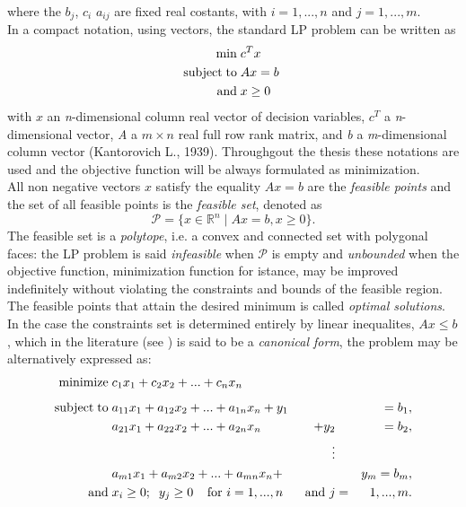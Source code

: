 \documentclass[a4paper,10 pt,titlepage,twoside]{book}
\theoremstyle{plain}
\theoremstyle{definition}
\theoremstyle{remark}
\begin{document}
where the $b_{j}$, $c_{i}$  $a_{ij}$ are fixed real costants, with $i=1,...,n$ and $j=1,...,m$.\\ In a compact notation, using vectors, the standard LP problem can be written as
\begin{equation}\label{(Prim)}
 \begin{split}
\min\;&c^{T}x\\
\text{subject\;to\;}&Ax= b\;\\\text{and\;}&x\geq0
 \end{split}
\end{equation}
with $x$ an \textit{n}-dimensional column real vector of decision variables, $c^
{T}$ a \textit{n}-dimensional vector, \textit{A} a $m \times n$ real full row rank matrix, and \textit{b} a \textit{m}-dimensional column vector (Kantorovich L., 1939).
Throughgout the thesis these notations are used and the objective function will be always formulated as minimization.\\
All non negative vectors $x$ satisfy the equality $Ax = b$ are the \textit{feasible points} and the set of all feasible points is the \textit{feasible set}, denoted as \begin{equation}\label{PP}
\mathcal{P}=\lbrace x\in\mathbb{R}^{n}\; |\; Ax = b , x \geq0\rbrace.
\end{equation} The feasible set is a \textit{polytope}, i.e. a convex and connected set with polygonal faces: the LP problem is said \textit{infeasible} when $\mathcal{P}$ is empty and \textit{unbounded} when the objective function, minimization function for istance, may be improved indefinitely without violating the constraints and bounds of the feasible region.\\The feasible points that attain the desired minimum is
called \textit{optimal solutions}.\\
In the case the constraints set is determined entirely by linear inequalites, $Ax \leq b$, which in the literature (see \cite{W}) is said to be a \textit{canonical form}, the problem may be alternatively expressed as:
\begin{alignat*}{3}
\text{minimize\;}&c_1 x_1 + c_2 x_2+ ...+c_n x_n&&&\\[1.8mm]
\text{subject\;to\;}&a_{11} x_1 +a_{12}x_2 + ... +a_{1n}x_n +y_{1}&&&= b_1,\\
		   	&a_{21}x_1+a_{22}x_2+ ... +a_{2n}x_n&+y_{2}&&= b_2,\\
&&\;\;\;\vdots&&\\
&a_{m1}x_1+a_{m2}x_2+ ... +a_{mn}x_n+&&&y_{m}=b_m,\\
\text{and} \;& x_{i} \geq 0;\;\; y_{j} \geq 0 \text{\;\;\;\;for }i = 1,...,n&\text{ and }j&=&1,...,m.
\end{alignat*}
\end{document}
